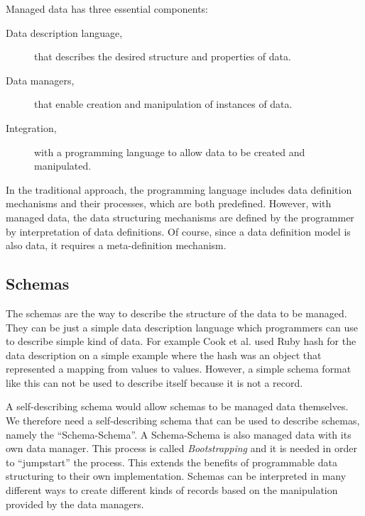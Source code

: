 Managed data has three essential components:

\begin{description}
	\item [Data description language,] that describes the desired structure and properties of data.

	\item [Data managers,] that enable creation and manipulation of instances of data.

	\item [Integration,] with a programming language to allow data to be created and manipulated.
\end{description}

In the traditional approach, the programming language includes data definition mechanisms and their processes, which are both predefined. 
However, with managed data, the data structuring mechanisms are defined by the programmer by interpretation of data definitions.
Of course, since a data definition model is also data, it requires a meta-definition mechanism.

\subsection{Schemas}\label{Schemas}
The schemas are the way to describe the structure of the data to be managed. 
They can be just a simple data description language which programmers can use to describe simple kind of data. 
For example Cook et al. \cite{loh2012managed} used Ruby hash for the data description on a simple example where the hash was an object that represented a mapping from values to values. 
However, a simple schema format like this can not be used to describe itself because it is not a record. 

A self-describing schema would allow schemas to be managed data themselves. 
We therefore need a self-describing schema that can be used to describe schemas, namely the ``Schema-Schema''. 
A Schema-Schema is also managed data with its own data manager.
This process is called \textit{Bootstrapping} and it is needed in order to ``jumpstart'' the process. 
This extends the benefits of programmable data structuring to their own implementation.
Schemas can be interpreted in many different ways to create different kinds of records based on the manipulation provided by the data managers.

